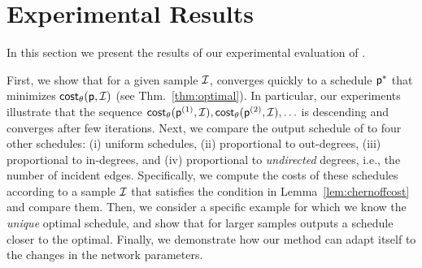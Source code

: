 \section{Experimental Results}\label{sec:exp}
In this section we present the results of our experimental evaluation of
\algonameapx.

 First, we show that for a given sample $\mathcal{I}$, \algonameapx
converges quickly to a schedule $\mathsf{p}^*$ that minimizes $\mathsf{cost}_\theta(\mathsf{p},
\mathcal{I})$ (see Thm.~\ref{thm:optimal}). In particular, our experiments
illustrate that the sequence $\mathsf{cost}_\theta(\mathsf{p}^{(1)},\mathcal{I}),
\mathsf{cost}_\theta(\mathsf{p}^{(2)}, \mathcal{I}),
\ldots$ is descending and converges after few iterations. Next, we compare the
output schedule of \algonameapx to four other schedules: (i) uniform schedules,
(ii) proportional to out-degrees, (iii) proportional to in-degrees, and (iv) proportional to \emph{undirected} degrees, i.e., the number of incident edges.
Specifically, we compute the costs of these schedules according to a sample
$\mathcal{I}$ that satisfies the condition in Lemma~\ref{lem:chernoffcost} and
compare them.
Then, we consider a specific example for which we know
the \emph{unique} optimal schedule, and show that for larger samples
\algonameapx outputs a schedule closer to the optimal.
 Finally, we demonstrate how our method can adapt itself to the changes in the
network parameters.


